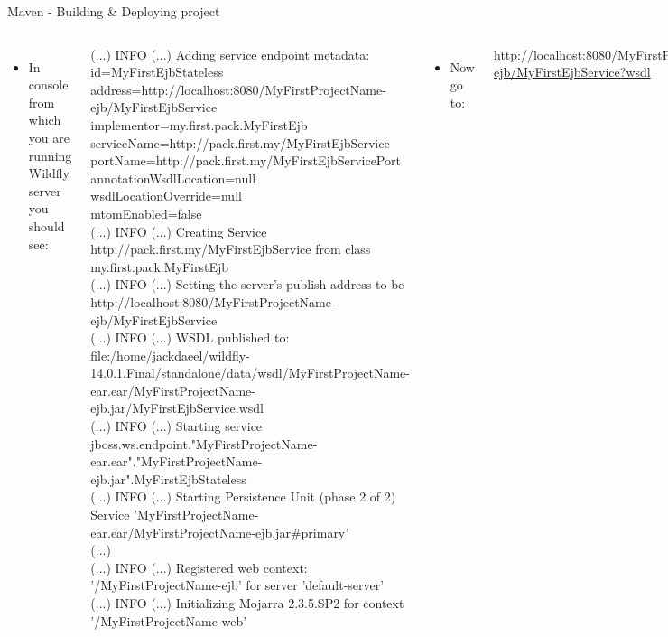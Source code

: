 \documentclass[aspectratio=1610,english]{beamer} %
\begin{document}
\begin{frame}{Maven - Building \& Deploying project}
\begin{columns}
				\begin{itemize}
					\tiny
					\color{black}
					\item In console from which you are running Wildfly server \\
						you should see:
				\end{itemize}
				\fontsize{3}{4} \selectfont
				(...) INFO (...) Adding service endpoint metadata: id=MyFirstEjbStateless \\
address=http://localhost:8080/MyFirstProjectName-ejb/MyFirstEjbService \\
implementor=my.first.pack.MyFirstEjb \\
serviceName={http://pack.first.my/}MyFirstEjbService \\
portName={http://pack.first.my/}MyFirstEjbServicePort \\
annotationWsdlLocation=null \\
wsdlLocationOverride=null \\
mtomEnabled=false \\
				(...) INFO (...) Creating Service {http://pack.first.my/}MyFirstEjbService from class my.first.pack.MyFirstEjb \\
				(...) INFO (...) Setting the server's publish address to be http://localhost:8080/MyFirstProjectName-ejb/MyFirstEjbService \\
				(...) INFO (...) WSDL published to: file:/home/jackdaeel/wildfly-14.0.1.Final/standalone/data/wsdl/MyFirstProjectName-ear.ear/MyFirstProjectName-ejb.jar/MyFirstEjbService.wsdl \\				
				(...) INFO (...) Starting service jboss.ws.endpoint."MyFirstProjectName-ear.ear"."MyFirstProjectName-ejb.jar".MyFirstEjbStateless \\ 
				(...) INFO (...) Starting Persistence Unit (phase 2 of 2) Service 'MyFirstProjectName-ear.ear/MyFirstProjectName-ejb.jar\#primary' \\
				(...) \\
				(...) INFO (...) Registered web context: '/MyFirstProjectName-ejb' for server 'default-server' \\
				(...) INFO (...) Initializing Mojarra 2.3.5.SP2 for context '/MyFirstProjectName-web' \\
				\begin{itemize}
					\tiny
					\color{black}
					\item Now go to:
				\end{itemize}
				\tiny
				\url{http://localhost:8080/MyFirstProjectName-ejb/MyFirstEjbService?wsdl}
		\end{columns}
	\end{frame}
\end{document}
